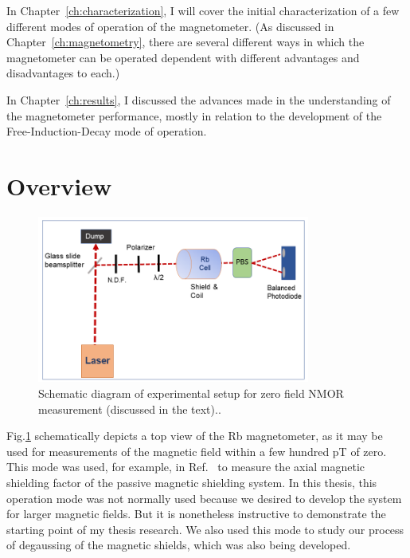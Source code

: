 In Chapter~\ref{ch:characterization}, I will cover the initial
characterization of a few different modes of operation of the
magnetometer.  (As discussed in Chapter~\ref{ch:magnetometry}, there
are several different ways in which the magnetometer can be operated
dependent with different advantages and disadvantages to each.)

In Chapter~\ref{ch:results}, I discussed the advances made in the
understanding of the magnetometer performance, mostly in relation to
the development of the Free-Induction-Decay mode of operation.


\section{Overview}

\begin{figure}%
\centering
\includegraphics[width=0.8\textwidth]{figures/experimental_setup_zero_field}
\caption{Schematic diagram of experimental setup for zero field NMOR measurement (discussed in the text).\label{fig:zerofield}.}
\end{figure}

Fig.\ref{fig:zerofield} schematically depicts a top view of the Rb
magnetometer, as it may be used for measurements of the magnetic field
within a few hundred pT of zero.  This mode was used, for example, in
Ref.~\cite{Martin:2014foa} to measure the axial magnetic shielding
factor of the passive magnetic shielding system.  In this thesis, this
operation mode was not normally used because we desired to develop the
system for larger magnetic fields.  But it is nonetheless instructive
to demonstrate the starting point of my thesis research.  We also used
this mode to study our process of degaussing of the magnetic shields,
which was also being developed.

